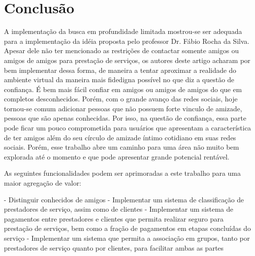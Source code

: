 

\section{Conclusão}\label{sec:conclusao}

A implementação da busca em profundidade limitada mostrou-se ser adequada para a implementação da idéia proposta pelo professor Dr. Fábio Rocha da Silva.
Apesar dele não ter mencionado as restrições de contactar somente amigos ou amigos de amigos para prestação de serviços, os autores deste artigo acharam por bem implementar dessa forma, de maneira a tentar aproximar a realidade do ambiente virtual da maneira mais fidedigna possível no que diz a questão de confiança. É bem mais fácil confiar em amigos ou amigos de amigos do que em completos desconhecidos. Porém, com o grande avanço das redes sociais, hoje tornou-se comum adicionar pessoas que não possuem forte vinculo de amizade, pessoas que são apenas conhecidas. Por isso, na questão de confiança, essa parte pode ficar um pouco comprometida para usuários que apresentam a característica de ter amigos além do seu círculo de amizade íntimo cotidiano em suas redes sociais. Porém, esse trabalho abre um caminho para uma área não muito bem explorada até o momento e que pode apresentar grande potencial rentável.

As seguintes funcionalidades podem ser aprimoradas a este trabalho para uma maior agregação de valor:

- Distinguir conhecidos de amigos
- Implementar um sistema de classificação de prestadores de serviço, assim como de clientes
- Implementar um sistema de pagamentos entre prestadores e clientes que permita realizar seguro para prestação de serviços, bem como a fração de pagamentos em etapas concluídas do serviço
- Implementar um sistema que permita a associação em grupos, tanto por prestadores de serviço quanto por clientes, para facilitar ambas as partes
